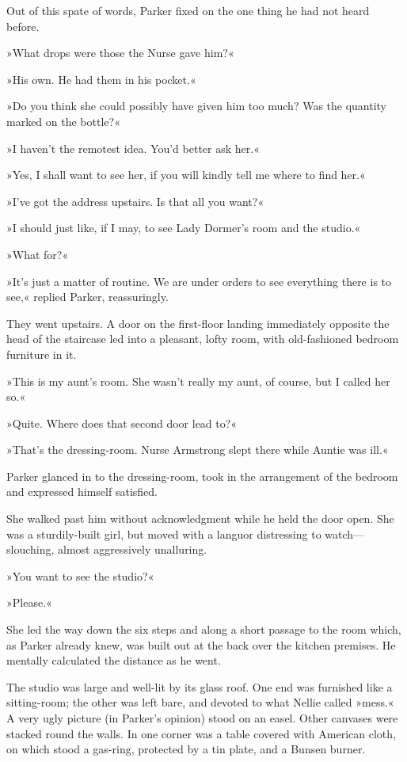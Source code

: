 Out of this spate of words, Parker fixed on the one thing he had not heard before.

»What drops were those the Nurse gave him?«

»His own. He had them in his pocket.«

»Do you think she could possibly have given him too much? Was the quantity marked on the bottle?«

»I haven't the remotest idea. You'd better ask her.«

»Yes, I shall want to see her, if you will kindly tell me where to find her.«

»I've got the address upstairs. Is that all you want?«

»I should just like, if I may, to see Lady Dormer's room and the studio.«

»What for?«

»It's just a matter of routine. We are under orders to see everything there is to see,« replied Parker, reassuringly.

They went upstairs. A door on the first-floor landing immediately opposite the head of the staircase led into a pleasant, lofty room, with old-fashioned bedroom furniture in it.

»This is my aunt's room. She wasn't really my aunt, of course, but I called her so.«

»Quite. Where does that second door lead to?«

»That's the dressing-room. Nurse Armstrong slept there while Auntie was ill.«

Parker glanced in to the dressing-room, took in the arrangement of the bedroom and expressed himself satisfied.

She walked past him without acknowledgment while he held the door open. She was a sturdily-built girl, but moved with a languor distressing to watch—slouching, almost aggressively unalluring.

»You want to see the studio?«

»Please.«

She led the way down the six steps and along a short passage to the room which, as Parker already knew, was built out at the back over the kitchen premises. He mentally calculated the distance as he went.

The studio was large and well-lit by its glass roof. One end was furnished like a sitting-room; the other was left bare, and devoted to what Nellie called »mess.« A very ugly picture (in Parker's opinion) stood on an easel. Other canvases were stacked round the walls. In one corner was a table covered with American cloth, on which stood a gas-ring, protected by a tin plate, and a Bunsen burner.

